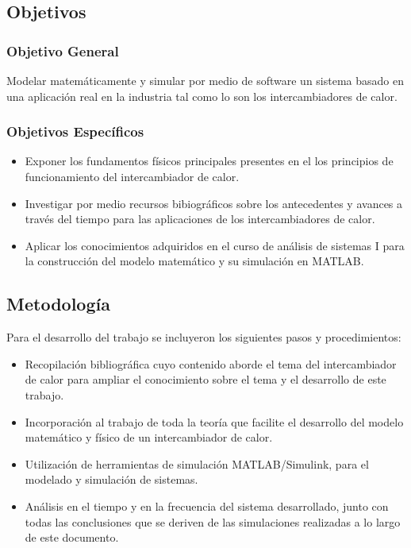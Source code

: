 \documentclass[12pt,letterpaper]{article}     %
\begin{document}
\subsection{Objetivos}
\subsubsection{Objetivo General}
Modelar matemáticamente y simular por medio de software un sistema basado en una aplicación real en la industria tal como lo son los intercambiadores de calor.

\subsubsection{Objetivos Específicos}
\begin{itemize}
\item Exponer los fundamentos físicos principales presentes en el los principios de funcionamiento del intercambiador de calor.
\item Investigar por medio recursos bibiográficos sobre los antecedentes y avances a través del tiempo para las aplicaciones de los intercambiadores de calor.
\end{itemize}
\begin{itemize}
\item Aplicar los conocimientos adquiridos en el curso de análisis de sistemas I para la construcción del modelo matemático y su simulación en MATLAB.
\end{itemize}

\subsection{Metodología}
Para el desarrollo del trabajo se incluyeron  los siguientes pasos y procedimientos:

\begin{itemize}

\item Recopilación bibliográfica cuyo contenido aborde el tema del intercambiador de calor para ampliar el conocimiento sobre el tema y el desarrollo de este trabajo.
\item Incorporación al trabajo de toda la teoría que facilite el desarrollo del modelo matemático y físico de un intercambiador de calor. 
\item Utilización de herramientas de simulación MATLAB/Simulink, para el modelado y simulación de sistemas.
\item Análisis en el tiempo y en la frecuencia del sistema desarrollado, junto con todas las conclusiones que se deriven de las simulaciones realizadas a lo largo de este documento.
 
 \end{itemize}
\end{document}
